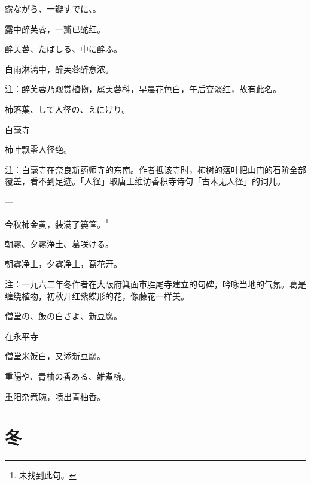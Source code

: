 \begin{haiku}
    {\FH 露ながら、一瓣すでに、。}

    {\FK 露中醉芙蓉，一瓣已酡红。}
\end{haiku}

\begin{haiku}
    {\FH 酔芙蓉、たばしる、中に酔ふ。}

    {\FK 白雨淋漓中，醉芙蓉醉意浓。}

    {\FT 注：醉芙蓉乃观赏植物，属芙蓉科，早晨花色白，午后变淡红，故有此名。}
\end{haiku}

\begin{haiku}
    {\FH 柿落葉、して人径の、えにけり。}

    {\FK 白毫寺}

    {\FK 柿叶飘零人径绝。}

    {\FT 注：白毫寺在奈良新药师寺的东南。作者抵该寺时，柿树的落叶把山门的石阶全部覆盖，看不到足迹。「人径」取唐王维访香积寺诗句「古木无人径」的词儿。}
\end{haiku}

\begin{haiku}
    {\FH ---}

    {\FK 今秋柿金黄，装满了篓筐。\footnote{\FT 未找到此句。}}
\end{haiku}

\begin{haiku}
    {\FH 朝霧、夕霧浄土、葛咲ける。}

    {\FK 朝雾净土，夕雾净土，葛花开。}

    {\FT 注：一九六二年冬作者在大阪府箕面市胜尾寺建立的句碑，吟咏当地的气氛。葛是缠绕植物，初秋开红紫蝶形的花，像藤花一样美。}
\end{haiku}

\begin{haiku}
    {\FH 僧堂の、飯の白さよ、新豆腐。}

    {\FK 在永平寺}

    {\FK 僧堂米饭白，又添新豆腐。}
\end{haiku}

\begin{haiku}
    {\FH 重陽や、青柚の香ある、雑煮椀。}

    {\FK 重阳杂煮碗，喷出青柚香。}
\end{haiku}

\section{\FK 冬}

